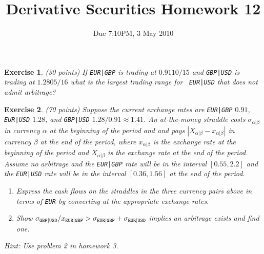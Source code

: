 \documentclass[11pt,fleqn]{amsproc}
\newtheorem{xca}{Exercise}
\begin{document}
\title{Derivative Securities Homework 12}
\author{Due 7:10PM, 3 May 2010}

\maketitle

\begin{xca}{(30 points)}
If {\small\tt EUR|GBP} is trading at $0.9110/15$ and {\small\tt GBP|USD}
is trading at $1.2805/16$ what is the largest trading range for {\small\tt
EUR|USD} that does not admit arbitrage?
\end{xca}

\begin{xca}{(70 points)}
Suppose the current exchange rates are {\small\tt EUR|GBP} $0.91$,
{\small\tt EUR|USD} $1.28$, and {\small\tt GBP|USD} $1.28/0.91 \approx
1.41$. An at-the-money straddle costs $\sigma_{\alpha|\beta}$ in currency
$\alpha$ at the beginning of the period and and pays $|X_{\alpha|\beta}
- x_{\alpha|\beta}|$ in currency $\beta$ at the end of the period,
where $x_{\alpha|\beta}$ is the exchange rate at the beginning of the
period and $X_{\alpha|\beta}$ is the exchange rate at the end of the
period. Assume no arbitrage and the {\small\tt EUR|GBP} rate will be in
the interval $[0.55, 2.2]$ and the {\small\tt EUR|USD} rate will be in
the interval $[0.36, 1.56]$ at the end of the period. 
\begin{enumerate}
\item Express the cash flows on the straddles in the three currency
pairs above in terms of {\small\tt EUR} by converting at the appropriate
exchange rates. 
\item Show $\sigma_{\tt GBP|USD}/x_{\tt EUR|GBP} > \sigma_{\tt EUR|GBP}
+ \sigma_{\tt EUR|USD}$ implies an arbitrage exists and find one.
\end{enumerate}
Hint: Use problem 2 in homework 3.
\end{xca}
\end{document}
